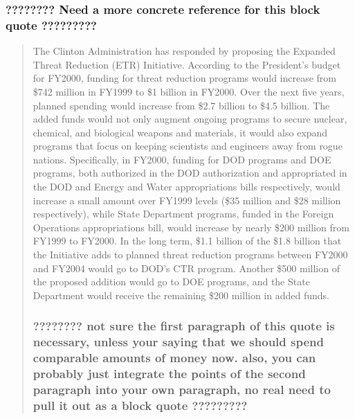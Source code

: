 \documentclass{report}
\begin{document}
\subsubsection{????????  Need a more concrete reference for this block quote   ?????????}


\blockquote{The Clinton Administration has responded by proposing the Expanded Threat Reduction (ETR) Initiative. According to the President's budget for FY2000, funding for threat reduction programs would increase from \$742 million in FY1999 to \$1 billion in FY2000. Over the next five years, planned spending would increase from \$2.7 billion to \$4.5 billion. The added funds would not only augment ongoing programs to secure nuclear, chemical, and biological weapons and materials, it would also expand programs that focus on keeping scientists and engineers away from rogue nations. Specifically, in FY2000, funding for DOD programs and DOE programs, both authorized in the DOD authorization and appropriated in the DOD and Energy and Water appropriations bills respectively, would increase a small amount over FY1999 levels (\$35 million and \$28 million respectively), while State Department programs, funded in the Foreign Operations appropriations bill, would increase by nearly \$200 million from FY1999 to FY2000. In the long term, \$1.1 billion of the \$1.8 billion that the Initiative adds to planned threat reduction programs between FY2000 and FY2004 would go to DOD's CTR program. Another \$500 million of the proposed addition would go to DOE programs, and the State Department would receive the remaining \$200 million in added funds.

\subsubsection{???????? not sure the first paragraph of this quote is necessary, unless your saying that we should spend comparable amounts of money now. also, you can probably just integrate the points of the second paragraph into your own paragraph, no real need to pull it out as a block quote  ?????????} 

}
\end{document}
